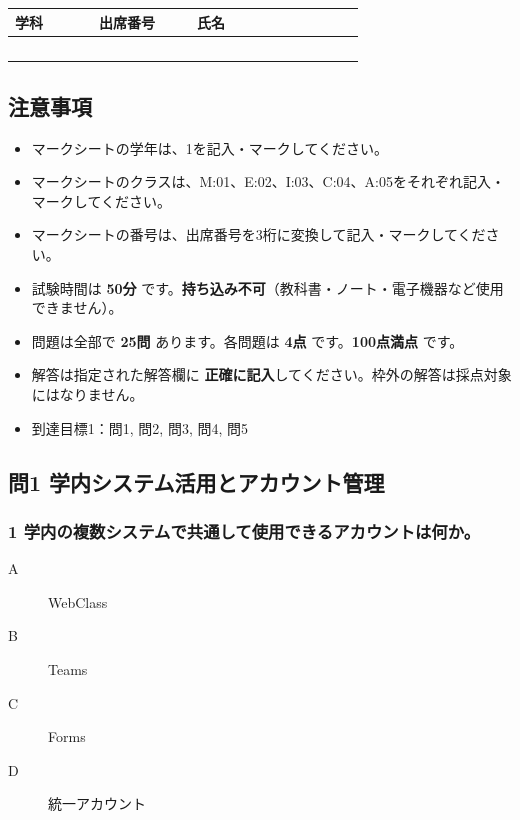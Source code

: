 \documentclass[a4paper,6pt]{jsarticle}
\begin{document}
\vspace*{-10mm}
\begin{flushright}
  \renewcommand{\arraystretch}{3} %
  \begin{tabular}{|p{2cm}|p{2cm}|p{6cm}|}
    \hline
    \textbf{学科} & \textbf{出席番号} & \textbf{氏名} \\
    \hline
      　　　　　& 　　　　　　& 　　　　　　　　　　　\\
    \hline
  \end{tabular}
\end{flushright}
\vspace{5mm}


\subsection*{注意事項}

\begin{itemize}
  \item マークシートの学年は、1を記入・マークしてください。
  \item マークシートのクラスは、M:01、E:02、I:03、C:04、A:05をそれぞれ記入・マークしてください。
  \item マークシートの番号は、出席番号を3桁に変換して記入・マークしてください。
  \item 試験時間は \textbf{50分} です。\textbf{持ち込み不可}（教科書・ノート・電子機器など使用できません）。
  \item 問題は全部で \textbf{25問} あります。各問題は \textbf{4点} です。\textbf{100点満点} です。
  \item 解答は指定された解答欄に \textbf{正確に記入}してください。枠外の解答は採点対象にはなりません。
  \item 到達目標1：問1, 問2, 問3, 問4, 問5
\end{itemize}




\subsection*{問1 学内システム活用とアカウント管理}

\subsubsection*{1 学内の複数システムで共通して使用できるアカウントは何か。}
\begin{description}
  \item[A] WebClass
  \item[B] Teams
  \item[C] Forms
  \item[D] 統一アカウント
\end{description}
\end{document}
